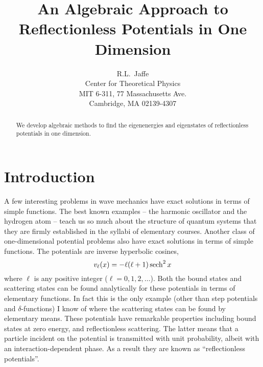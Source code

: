 \documentclass[12pt,twoside]{article}
\newcommand{\sech}{\mathop{\rm sech}\nolimits}
\begin{document}


\title{An Algebraic Approach to Reflectionless Potentials in One Dimension}
\author{R.L.~Jaffe\\
\small Center for Theoretical Physics\\
\small MIT 6-311, 77 Massachusetts Ave.\\
\small Cambridge, MA 02139-4307\\[-0.25in]} \date{} %
\maketitle

\pagestyle{myheadings}
\thispagestyle{empty}

\begin{abstract}
\noindent
We develop algebraic methods to find the eigenenergies and 	eigenstates of reflectionless potentials in one dimension.  \end{abstract}

\section{Introduction}

A few interesting problems in wave mechanics have exact solutions in terms of simple functions.  The best known examples --  the
harmonic oscillator and the hydrogen atom -- teach us so much  about the
structure of quantum systems that they are firmly  established in the syllabi
of elementary courses.  Another class of  one-dimensional potential problems
also have exact solutions in terms  of simple functions.  The potentials are
inverse hyperbolic cosines,
%
\begin{equation}     v_\ell (x) = -\ell(\ell+1)\sech^2x     \label{1.1} \end{equation} %
where $\ell$ is any positive integer ($\ell = 0,1,2,\ldots$).  Both the bound states and scattering states can be found analytically for these potentials in terms of elementary functions.  In fact this is the only example (other than step potentials and $\delta$-functions) I know of where the scattering states can be found by elementary means.
These potentials have remarkable properties including bound states at zero energy, and reflectionless scattering.  The latter means that a particle incident on the potential is transmitted with unit probability, albeit with an interaction-dependent phase.  As a result they are known as ``reflectionless potentials''.
\end{document}
